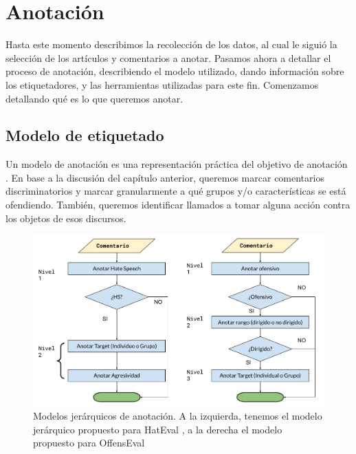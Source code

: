 \section{Anotación}

Hasta este momento describimos la recolección de los datos, al cual le siguió la selección de los artículos y comentarios a anotar. Pasamos ahora a detallar el proceso de anotación, describiendo el modelo utilizado, dando información sobre los etiquetadores, y las herramientas utilizadas para este fin. Comenzamos detallando qué es lo que queremos anotar.


\subsection{Modelo de etiquetado}


Un modelo de anotación es una representación práctica del objetivo de anotación \cite{pustejovsky2012natural}. En base a la discusión del capítulo anterior, queremos marcar comentarios discriminatorios y marcar granularmente a qué grupos y/o características se está ofendiendo. También, queremos identificar llamados a tomar alguna acción contra los objetos de esos discursos.

\begin{figure}
    \centering
    \includegraphics[width=\textwidth]{img/05/modelos_jerarquicos.pdf}
    \caption{Modelos jerárquicos de anotación. A la izquierda, tenemos el modelo jerárquico propuesto para HatEval \cite{hateval2019semeval}, a la derecha el modelo propuesto para OffensEval \cite{zampieri2019semeval2019}}
    \label{fig:modelos_offenseval_hateval}
\end{figure}


